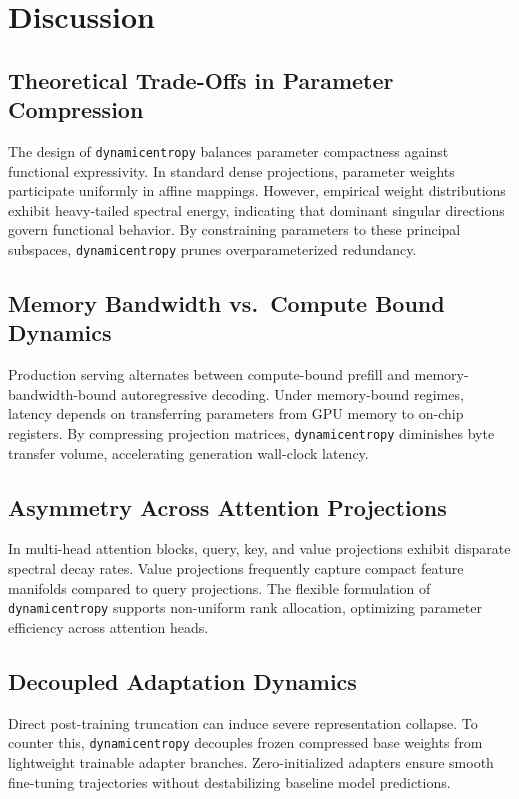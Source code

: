 \section{Discussion}

\subsection{Theoretical Trade-Offs in Parameter Compression}
The design of \texttt{dynamicentropy} balances parameter compactness against functional expressivity. In standard dense projections, parameter weights participate uniformly in affine mappings. However, empirical weight distributions exhibit heavy-tailed spectral energy, indicating that dominant singular directions govern functional behavior. By constraining parameters to these principal subspaces, \texttt{dynamicentropy} prunes overparameterized redundancy.

\subsection{Memory Bandwidth vs.\ Compute Bound Dynamics}
Production serving alternates between compute-bound prefill and memory-bandwidth-bound autoregressive decoding. Under memory-bound regimes, latency depends on transferring parameters from GPU memory to on-chip registers. By compressing projection matrices, \texttt{dynamicentropy} diminishes byte transfer volume, accelerating generation wall-clock latency.

\subsection{Asymmetry Across Attention Projections}
In multi-head attention blocks, query, key, and value projections exhibit disparate spectral decay rates. Value projections frequently capture compact feature manifolds compared to query projections. The flexible formulation of \texttt{dynamicentropy} supports non-uniform rank allocation, optimizing parameter efficiency across attention heads.

\subsection{Decoupled Adaptation Dynamics}
Direct post-training truncation can induce severe representation collapse. To counter this, \texttt{dynamicentropy} decouples frozen compressed base weights from lightweight trainable adapter branches. Zero-initialized adapters ensure smooth fine-tuning trajectories without destabilizing baseline model predictions.


